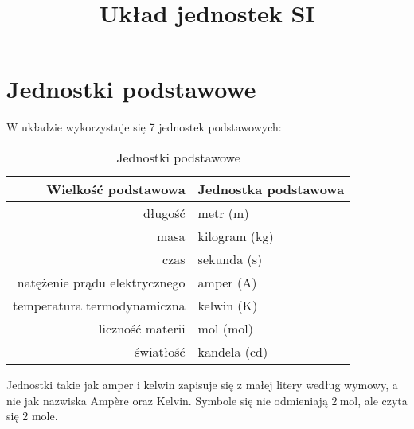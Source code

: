 \documentclass{article}
\title{Układ jednostek SI}
\date{}
\begin{document}
\maketitle
\section{Jednostki podstawowe}
W układzie wykorzystuje się 7 jednostek podstawowych:
\begin{table}[H]
\centering
\begin{tabular}{rl}
\toprule
Wielkość podstawowa & Jednostka podstawowa \\
\midrule
długość & metr (\unit{\m}) \\
masa & kilogram (\unit{\kg}) \\
czas & sekunda (\unit{\s}) \\
natężenie prądu elektrycznego & amper (\unit{\A}) \\
temperatura termodynamiczna & kelwin (\unit{\K}) \\
liczność materii & mol (\unit{\mol}) \\
światłość & kandela (\unit{\candela}) \\
\bottomrule
\end{tabular}
\caption{Jednostki podstawowe}
\end{table}
Jednostki takie jak amper i kelwin zapisuje się z małej litery według wymowy, a nie jak nazwiska Amp\`{e}re oraz Kelvin. Symbole się nie odmieniają $\qty{2}{\mol}$, ale czyta się $2$ mole.
\end{document}
